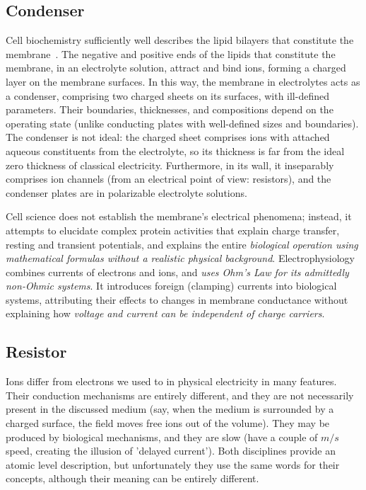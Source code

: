 \subsection{Condenser\label{sec:Physics-Condenser}}
\else
\fi


\ifx\magyar\undefined
Cell biochemistry sufficiently well describes the lipid bilayers that constitute the membrane~\cite{OriginOfLifeMicelles:2021,ReproductionLife:2023}.
The negative and positive ends of the lipids that constitute the membrane, in an electrolyte solution, attract and bind ions, forming a charged layer on the membrane surfaces. In this way, the membrane in electrolytes acts as a condenser, comprising two charged sheets on its surfaces, with ill-defined parameters. Their boundaries, thicknesses, and compositions depend on the operating state (unlike conducting plates with well-defined sizes and boundaries). The condenser is not ideal: the charged sheet comprises ions with attached aqueous constituents from the electrolyte, so its thickness is far from the ideal zero thickness of classical electricity. Furthermore, in its wall, it inseparably comprises ion channels (from an electrical point of view: resistors), and the condenser plates are in polarizable electrolyte solutions. 

Cell science does not establish the membrane's electrical phenomena; instead, it attempts to elucidate complex protein activities that explain charge transfer, resting and transient potentials, and explains the entire \textit{biological operation using mathematical formulas without a realistic physical background}. Electrophysiology combines currents of electrons and ions, and \textit{uses Ohm’s Law for its admittedly non-Ohmic systems}. It introduces foreign (clamping) currents into biological systems, attributing their effects to changes in membrane conductance without explaining how \textit{voltage and current can be independent of charge carriers}.
\else

\fi

\ifx\magyar\undefined
\subsection{Resistor\label{sec:Physics-Resistor}}	
\else

\fi

\ifx\magyar\undefined
Ions differ from electrons we used to in physical electricity in many features. Their conduction mechanisms
are entirely different, and they are not necessarily present 
in the discussed medium (say, when the medium is surrounded by a charged surface, the field moves free ions out of the volume). They may be produced by biological mechanisms, 
and they are slow (have a couple of $m/s$ speed, creating the illusion
of 'delayed current').
Both disciplines provide an atomic level description, but unfortunately they use the same words for their concepts, although
their meaning can be entirely different. 

